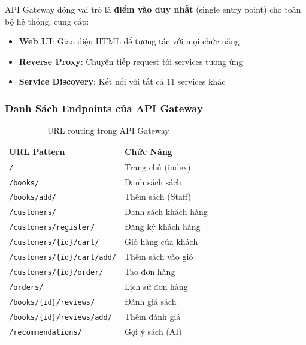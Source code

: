 \documentclass[12pt,a4paper]{article}
\begin{document}
API Gateway đóng vai trò là \textbf{điểm vào duy nhất} (single entry point) cho toàn bộ hệ thống, cung cấp:

\begin{itemize}[leftmargin=1.5cm]
  \item \textbf{Web UI}: Giao diện HTML để tương tác với mọi chức năng
  \item \textbf{Reverse Proxy}: Chuyển tiếp request tới services tương ứng
  \item \textbf{Service Discovery}: Kết nối với tất cả 11 services khác
\end{itemize}

\subsubsection{Danh Sách Endpoints của API Gateway}

\begin{table}[H]
  \centering
  \caption{URL routing trong API Gateway}
  \begin{tabularx}{\textwidth}{lX}
    \toprule
    \textbf{URL Pattern} & \textbf{Chức Năng} \\
    \midrule
    \texttt{/}                              & Trang chủ (index) \\
    \texttt{/books/}                        & Danh sách sách \\
    \texttt{/books/add/}                    & Thêm sách (Staff) \\
    \texttt{/customers/}                    & Danh sách khách hàng \\
    \texttt{/customers/register/}           & Đăng ký khách hàng \\
    \texttt{/customers/\{id\}/cart/}         & Giỏ hàng của khách \\
    \texttt{/customers/\{id\}/cart/add/}    & Thêm sách vào giỏ \\
    \texttt{/customers/\{id\}/order/}       & Tạo đơn hàng \\
    \texttt{/orders/}                       & Lịch sử đơn hàng \\
    \texttt{/books/\{id\}/reviews/}         & Đánh giá sách \\
    \texttt{/books/\{id\}/reviews/add/}     & Thêm đánh giá \\
    \texttt{/recommendations/}             & Gợi ý sách (AI) \\
    \bottomrule
  \end{tabularx}
\end{table}
\end{document}
